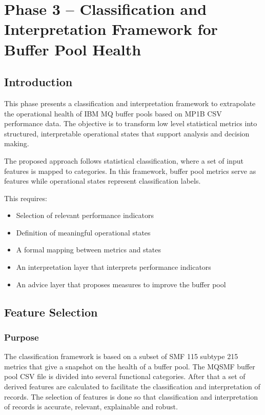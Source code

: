 \chapter{Phase 3 – Classification and Interpretation Framework for Buffer Pool Health}
\label{ch:phase3}


\section{Introduction}

This phase presents a classification and interpretation framework to extrapolate the operational health of IBM MQ buffer pools based on MP1B CSV performance data. The objective is to transform low level statistical metrics into structured, interpretable operational states that support analysis and decision making.

The proposed approach follows statistical classification, where a set of input features is mapped to categories. In this framework, buffer pool metrics serve as features while operational states represent classification labels. 

This requires:
\begin{itemize}
    \item Selection of relevant performance indicators
    \item Definition of meaningful operational states
    \item A formal mapping between metrics and states
    \item An interpretation layer that interprets performance indicators
    \item An advice layer that proposes measures to improve the buffer pool
\end{itemize}

\section{Feature Selection}

\subsection{Purpose}

The classification framework is based on a subset of SMF 115 subtype 215 metrics that give a snapshot on the health of a buffer pool. The MQSMF buffer pool CSV file is divided into several functional categories. After that a set of derived features are calculated to facilitate the classification and interpretation of records. The selection of features is done so that classification and interpretation of records is accurate, relevant, explainable and robust.

